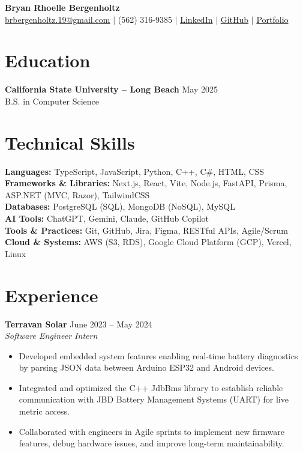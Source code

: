 \documentclass[a4paper,9.5pt]{article}
\newcommand{\dateright}[1]{\hfill {\small\textnormal{#1}}}
\begin{document}

\begin{center}
  {\LARGE \textbf{Bryan Rhoelle Bergenholtz}}\\[-1pt]
  \href{mailto:brbergenholtz.19@gmail.com}{brbergenholtz.19@gmail.com} $|$
  (562) 316-9385 $|$
  \href{https://linkedin.com/in/bryanbergenholtz}{LinkedIn} $|$
  \href{https://github.com/YanRho}{GitHub} $|$
  \href{https://yanrho.vercel.app}{Portfolio}
\end{center}

\section*{Education}
\textbf{California State University – Long Beach} \dateright{May 2025}\\
B.S. in Computer Science

\section*{Technical Skills}
\textbf{Languages:} TypeScript, JavaScript, Python, C++, C\#, HTML, CSS \\
\textbf{Frameworks \& Libraries:} Next.js, React, Vite, Node.js, FastAPI, Prisma, ASP.NET (MVC, Razor), TailwindCSS \\
\textbf{Databases:} PostgreSQL (SQL), MongoDB (NoSQL), MySQL \\
\textbf{AI Tools:} ChatGPT, Gemini, Claude, GitHub Copilot \\
\textbf{Tools \& Practices:} Git, GitHub, Jira, Figma, RESTful APIs, Agile/Scrum \\
\textbf{Cloud \& Systems:} AWS (S3, RDS), Google Cloud Platform (GCP), Vercel, Linux


\section*{Experience}
\textbf{Terravan Solar} \dateright{June 2023 – May 2024}\\
\textit{Software Engineer Intern}
\begin{itemize}
  \item Developed embedded system features enabling real-time battery diagnostics by parsing JSON data between Arduino ESP32 and Android devices.
  \item Integrated and optimized the C++ JdbBms library to establish reliable communication with JBD Battery Management Systems (UART) for live metric access.
  \item Collaborated with engineers in Agile sprints to implement new firmware features, debug hardware issues, and improve long-term maintainability.
\end{itemize}
\end{document}
